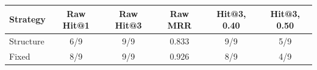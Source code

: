 {\small
\begin{tabularx}{\linewidth}{|Y|c|c|c|c|c|}\hline
\textbf{Strategy} & \textbf{Raw Hit@1} & \textbf{Raw Hit@3} & \textbf{Raw MRR} & \textbf{Hit@3, 0.40} & \textbf{Hit@3, 0.50}\\\hline
Structure & 6/9 & 9/9 & 0.833 & 9/9 & 5/9\\\hline
Fixed & 8/9 & 9/9 & 0.926 & 8/9 & 4/9\\\hline
\end{tabularx}}
